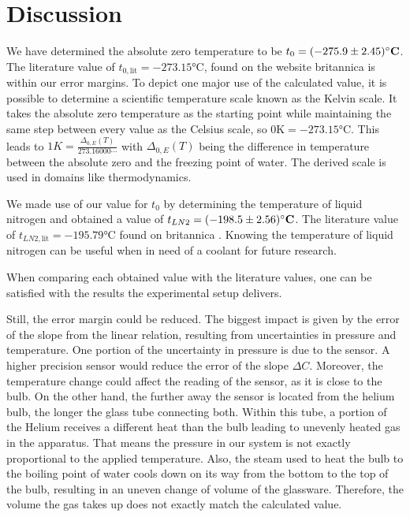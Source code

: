 \section{Discussion}
    We have determined the absolute zero temperature to be $t_0 = (-275.9 \pm 2.45)\si{\bf\celsius}$.
    The literature value of $t_{0, \text{lit}} = -273.15 \si{\celsius}$, found on the website britannica \cite{literature_absolute_zero} is within our error margins.
    To depict one major use of the calculated value, it is possible to determine a scientific temperature scale known as the Kelvin scale.
    It takes the absolute zero temperature as the starting point while maintaining the same step between every value as the Celsius scale, so $0 \si{\kelvin} = -273.15 \si{\celsius}$.
    This leads to $1K = \frac{\Delta_{0, E}(T)}{273.16000\cdots}$ with $\Delta_{0, E}(T)$ being the difference in temperature between the absolute zero and the freezing point of water.
    The derived scale is used in domains like thermodynamics.

    We made use of our value for $t_0$ by determining the temperature of liquid nitrogen and obtained a value of $t_{LN2} = (-198.5 \pm 2.56)\si{\bf\celsius}$.
    The literature value of $t_{LN2, \text{lit}} = -195.79 \si{\celsius}$ found on britannica \cite{literature_liquid_nitrogen}.
    Knowing the temperature of liquid nitrogen can be useful when in need of a coolant for future research.

    When comparing each obtained value with the literature values, one can be satisfied with the results the experimental setup delivers.

    Still, the error margin could be reduced.
    The biggest impact is given by the error of the slope from the linear relation, resulting from uncertainties in pressure and temperature.
    One portion of the uncertainty in pressure is due to the sensor.
    A higher precision sensor would reduce the error of the slope $\Delta C$.
    Moreover, the temperature change could affect the reading of the sensor, as it is close to the bulb.
    On the other hand, the further away the sensor is located from the helium bulb, the longer the glass tube connecting both.
    Within this tube, a portion of the Helium receives a different heat than the bulb leading to unevenly heated gas in the apparatus.
    That means the pressure in our system is not exactly proportional to the applied temperature.
    Also, the steam used to heat the bulb to the boiling point of water cools down on its way from the bottom to the top of the bulb, resulting in an uneven change of volume of the glassware.
    Therefore, the volume the gas takes up does not exactly match the calculated value.

